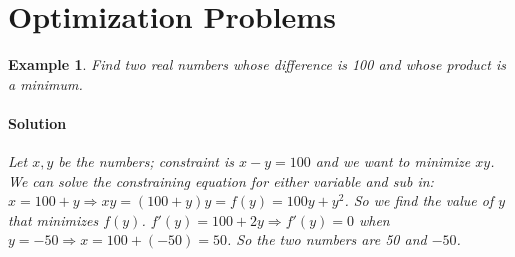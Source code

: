 \documentclass[letterpaper, 11pt, openany]{book}
\theoremstyle{mytheoremstyle}
\theoremstyle{myexamplestyle}
\newtheorem{example}{Example}[section]
\newenvironment{solution}{\paragraph{\sffamily \smaller \fontseries{b}\selectfont Solution}}{\hfill\faSquare}
\begin{document}
\section{Optimization Problems}
\begin{example}\label{optimize-core-problem}
    Find two real numbers whose difference is 100 and whose product is a minimum.
    \begin{solution}
        Let $x,y$ be the numbers; constraint is $x-y=100$ and we want to minimize $xy$. We can solve the constraining equation for either variable and sub in: $x = 100 + y \Rightarrow xy = (100+y)y = f(y) = 100y + y^{2}$. So we find the value of $y$ that minimizes $f(y)$. $f'(y) = 100 + 2y \Rightarrow f'(y) = 0$ when $y = -50 \Rightarrow x = 100 + (-50) = 50$. So the two numbers are 50 and $-50$.
    \end{solution}
\end{example}
\end{document}
